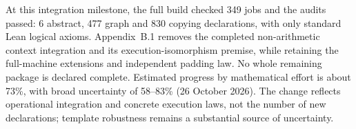 


At this integration milestone, the full build checked 349 jobs and the audits passed: 6 abstract,
477 graph and 830 copying declarations, with only standard Lean logical
axioms. Appendix~B.1 removes the completed non-arithmetic context integration
and its execution-isomorphism premise, while retaining the full-machine
extensions and independent padding law. No whole remaining package is declared
complete. Estimated progress by mathematical effort is about 73\%, with broad
uncertainty of 58--83\% (26 October 2026). The change reflects operational
integration and concrete execution laws, not the number of new declarations;
template robustness remains a substantial source of uncertainty.

